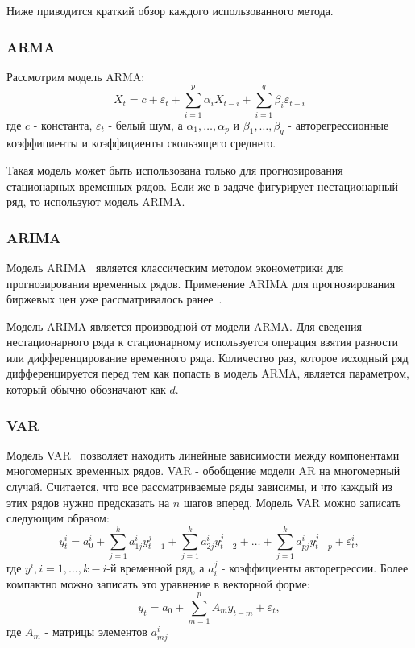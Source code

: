\documentclass[a4paper,article,14pt]{extarticle}
\begin{document}
Ниже приводится краткий обзор каждого использованного метода.

\subsubsection{ARMA}
Рассмотрим модель ARMA:
\begin{equation}
    \label{eq:arma}
    X_{t}=c+\varepsilon _{t}+\sum _{i=1}^{p}\alpha _{i}X_{t-i}+\sum _{i=1}^{q}\beta _{i}\varepsilon _{t-i}
\end{equation}
где $c$ - константа, ${\varepsilon _t}$ - белый шум, а $\alpha_1, \dots, \alpha_p$ и $\beta_1, \dots, \beta_q$ - авторегрессионные коэффициенты и коэффициенты скользящего среднего.
\par
Такая модель может быть использована только для прогнозирования стационарных временных рядов.
Если же в задаче фигурирует нестационарный ряд, то используют модель ARIMA\@.

\subsubsection{ARIMA}
Модель ARIMA~\cite{arima} является классическим методом эконометрики для прогнозирования временных рядов.
Применение ARIMA для прогнозирования биржевых цен уже рассматривалось ранее~\cite{my_arima_article}.
\par
Модель ARIMA является производной от модели ARMA\@.
Для сведения нестационарного ряда к стационарному используется операция взятия разности или дифференцирование временного ряда.
Количество раз, которое исходный ряд дифференцируется перед тем как попасть в модель ARMA, является параметром, который обычно обозначают как $d$.

\subsubsection{VAR}
Модель VAR~\cite{var} позволяет находить линейные зависимости между компонентами многомерных временных рядов.
VAR - обобщение модели AR на многомерный случай.
Считается, что все рассматриваемые ряды зависимы, и что каждый из этих рядов нужно предсказать на $n$ шагов вперед.
Модель VAR можно записать следующим образом:
\begin{equation}
    y_{t}^{i}=a_{0}^{i}+\sum _{{j=1}}^{{k}}a_{{1j}}^{i}y_{{t-1}}^{j}+\sum _{{j=1}}^{{k}}a_{{2j}}^{i}y_{{t-2}}^{j}+\ldots +\sum _{{j=1}}^{{k}}a_{{pj}}^{i}y_{{t-p}}^{j}+\varepsilon _{{t}}^{i},
\end{equation}
где $y^{i}, i=1, \dots, k-i$-й временной ряд, а $a_{i}^{j}$ - коэффициенты авторегрессии.
Более компактно можно записать это уравнение в векторной форме:
\begin{equation}
    y_{t}=a_{0}+\sum _{{m=1}}^{p}A_{m}y_{{t-m}}+\varepsilon _{t},
\end{equation}
где $A_m$ - матрицы элементов $a^{i}_{mj}$
\par
\end{document}
